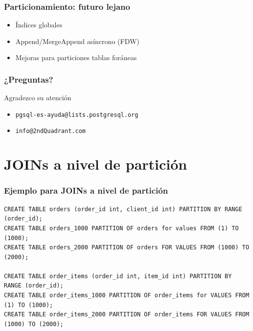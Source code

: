 \documentclass[ignorenonframetext,t]{beamer}
\begin{document}
\begin{frame}
	\frametitle{Particionamiento: futuro lejano}
	\begin{itemize}
		\item Índices globales
		\item Append/MergeAppend asíncrono (FDW)
		\item Mejoras para particiones tablas foráneas
	\end{itemize}
\end{frame}

\begin{frame}
	\frametitle{¿Preguntas?}

	\begin{center}
	\Large Agradezco su atención
	\end{center}
	\vskip 4cm
	
	\begin{itemize}
		\item \texttt{pgsql-es-ayuda@lists.postgresql.org}
		\item \texttt{info@2ndQuadrant.com}
	\end{itemize}
\end{frame}

\section{JOINs a nivel de partición}

\begin{frame}[fragile]
	\frametitle{Ejemplo para JOINs a nivel de partición}

  \footnotesize
  \begin{lstlisting}
CREATE TABLE orders (order_id int, client_id int) PARTITION BY RANGE (order_id);
CREATE TABLE orders_1000 PARTITION OF orders for values FROM (1) TO (1000);
CREATE TABLE orders_2000 PARTITION OF orders FOR VALUES FROM (1000) TO (2000);

CREATE TABLE order_items (order_id int, item_id int) PARTITION BY RANGE (order_id);
CREATE TABLE order_items_1000 PARTITION OF order_items for VALUES FROM (1) TO (1000);
CREATE TABLE order_items_2000 PARTITION OF order_items FOR VALUES FROM (1000) TO (2000);
  \end{lstlisting}

\end{frame}
\end{document}
